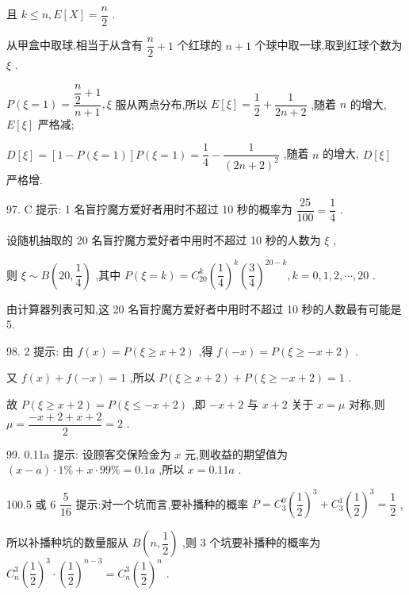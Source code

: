 且 $k \leq  n,E\left\lbrack  X\right\rbrack   = \dfrac{n}{2}$ .

从甲盒中取球,相当于从含有 $\dfrac{n}{2} + 1$ 个红球的 $n + 1$ 个球中取一球,取到红球个数为 $\xi$ .

$P\left( {\xi  = 1}\right)  = \dfrac{\dfrac{n}{2} + 1}{n + 1},\xi$ 服从两点分布,所以 $E\left\lbrack  \xi \right\rbrack   = \dfrac{1}{2} + \dfrac{1}{{2n} + 2}$ ,随着 $n$ 的增大, $E\left\lbrack  \xi \right\rbrack$ 严格减;

$D\left\lbrack  \xi \right\rbrack   = \left\lbrack  {1 - P\left( {\xi  = 1}\right) }\right\rbrack  P\left( {\xi  = 1}\right)  = \dfrac{1}{4} - \dfrac{1}{{\left( 2n + 2\right) }^{2}}$ ,随着 $n$ 的增大, $D\left\lbrack  \xi \right\rbrack$ 严格增.

97. C 提示: 1 名盲拧魔方爱好者用时不超过 10 秒的概率为 $\dfrac{25}{100} = \dfrac{1}{4}$ .

设随机抽取的 20 名盲拧魔方爱好者中用时不超过 10 秒的人数为 $\xi$ ,

则 $\xi  \sim  B\left( {{20},\dfrac{1}{4}}\right)$ ,其中 $P\left( {\xi  = k}\right)  = {C}_{20}^{k}{\left( \dfrac{1}{4}\right) }^{k}{\left( \dfrac{3}{4}\right) }^{{20} - k},k = 0,1,2,\cdots ,{20}$ .

由计算器列表可知,这 20 名盲拧魔方爱好者中用时不超过 10 秒的人数最有可能是 5.

98. 2 提示: 由 $f\left( x\right)  = P\left( {\xi  \geq  x + 2}\right)$ ,得 $f\left( {-x}\right)  = P\left( {\xi  \geq   - x + 2}\right)$ .

又 $f\left( x\right)  + f\left( {-x}\right)  = 1$ ,所以 $P\left( {\xi  \geq  x + 2}\right)  + P\left( {\xi  \geq   - x + 2}\right)  = 1$ .

故 $P\left( {\xi  \geq  x + 2}\right)  = P\left( {\xi  \leq   - x + 2}\right)$ ,即 $- x + 2$ 与 $x + 2$ 关于 $x = \mu$ 对称,则 $\mu  = \dfrac{-x + 2 + x + 2}{2} = 2$ .

99. 0.11a 提示: 设顾客交保险金为 $x$ 元,则收益的期望值为 $\left( {x - a}\right)  \cdot  1\%  + x \cdot  {99}\%  = {0.1a}$ ,所以 $x = {0.11a}$ .

100.5 或 6 $\dfrac{5}{16}$ 提示:对一个坑而言,要补播种的概率 $P = {C}_{3}^{0}{\left( \dfrac{1}{2}\right) }^{3} + {C}_{3}^{1}{\left( \dfrac{1}{2}\right) }^{3} = \dfrac{1}{2}$ ,

所以补播种坑的数量服从 $B\left( {n,\dfrac{1}{2}}\right)$ ,则 3 个坑要补播种的概率为 ${C}_{n}^{3}{\left( \dfrac{1}{2}\right) }^{3} \cdot  {\left( \dfrac{1}{2}\right) }^{n - 3} = {C}_{n}^{3}{\left( \dfrac{1}{2}\right) }^{n}$ .

